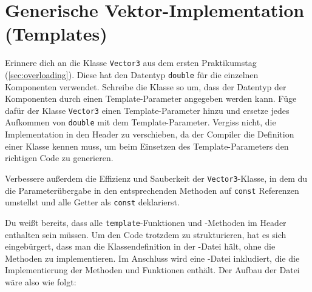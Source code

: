 \section{\ExercisePrefixAdvanced Generische Vektor-Implementation (Templates)}
\label{sec:genericVector}
Erinnere dich an die Klasse \lstinline{Vector3} aus dem ersten Praktikumstag (\ref{sec:overloading}).
Diese hat den Datentyp \lstinline{double} für die einzelnen Komponenten verwendet.
Schreibe die Klasse so um, dass der Datentyp der Komponenten durch einen Template-Parameter angegeben werden kann.
Füge dafür der Klasse \lstinline{Vector3} einen Template-Parameter hinzu und ersetze jedes Aufkommen von \lstinline{double} mit dem Template-Parameter.
Vergiss nicht, die Implementation in den Header zu verschieben, da der Compiler die Definition einer Klasse kennen muss, um beim Einsetzen des Template-Parameters den richtigen Code zu generieren.

Verbessere außerdem die Effizienz und Sauberkeit der \lstinline{Vector3}-Klasse, in dem du die Parameterübergabe in den entsprechenden Methoden auf \lstinline{const} Referenzen umstellst und alle Getter als \lstinline{const} deklarierst.

Du weißt bereits, dass alle \lstinline{template}-Funktionen und -Methoden im Header enthalten sein müssen.
Um den Code trotzdem zu strukturieren, hat es sich eingebürgert, dass man die Klassendefinition in der -Datei hält, ohne die Methoden zu implementieren.
Im Anschluss wird eine -Datei inkludiert, die die Implementierung der Methoden und Funktionen enthält.
%
Der Aufbau der Datei  wäre also wie folgt:

